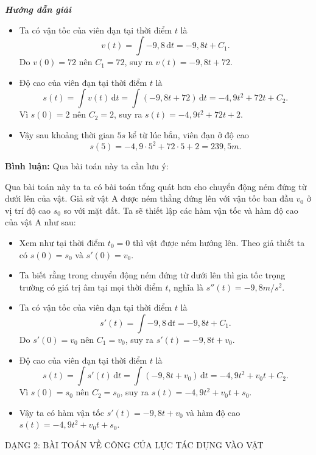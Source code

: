 \documentclass[12pt,a4paper]{article}
\newcommand{\dd}{\,\mathrm{d}}
\newcommand{\solution}{\begin{center}\textbf{\textit{Hướng dẫn giải}}\end{center}\par}
\newcommand{\commenthead}{\textbf{Bình luận:} Qua bài toán này ta cần lưu ý:\par}
\begin{document}
\solution
\begin{itemize}
\item Ta có vận tốc của viên đạn tại thời điểm $t$ là
\[
v(t)=\int-9,8\dd t=-9,8t+C_1.
\]
Do $v(0)=72$ nên $C_1=72$, suy ra $v(t)=-9,8t+72$.
\item Độ cao của viên đạn tại thời điểm $t$ là
\[
s(t)=\int v(t)\dd t=\int(-9,8t+72)\dd t=-4,9t^2+72t+C_2.
\]
Vì $s(0)=2$ nên $C_2=2$, suy ra $s(t)=-4,9t^2+72t+2$.
\item Vậy sau khoảng thời gian $5s$ kể từ lúc bắn, viên đạn ở độ cao
\[
s(5)=-4,9\cdot5^2+72\cdot5+2=239,5m.
\]
\end{itemize}

\begin{commentbox}\commenthead
Qua bài toán này ta ta có bài toán tổng quát hơn cho chuyển động ném đứng từ dưới lên của vật. Giả sử vật A được ném thẳng đứng lên với vận tốc ban đầu $v_0$ ở vị trí độ cao $s_0$ so với mặt đất. Ta sẽ thiết lập các hàm vận tốc và hàm độ cao của vật A như sau:
\end{commentbox}

\begin{itemize}
\item Xem như tại thời điểm $t_0=0$ thì vật được ném hướng lên. Theo giả thiết ta có $s(0)=s_0$
và $s'(0)=v_0$.
\item Ta biết rằng trong chuyển động ném đứng từ dưới lên thì gia tốc trọng trường có giá trị âm tại mọi thời điểm $t$, nghĩa là $s''(t)=-9,8m/s^2$.
\item Ta có vận tốc của viên đạn tại thời điểm $t$ là
\[
s'(t)=\int-9,8\dd t=-9,8t+C_1.
\]
Do $s'(0)=v_0$ nên $C_1=v_0$, suy ra $s'(t)=-9,8t+v_0$.
\item Độ cao của viên đạn tại thời điểm $t$ là
\[
s(t)=\int s'(t)\dd t=\int(-9,8t+v_0)\dd t=-4,9t^2+v_0t+C_2.
\]
Vì $s(0)=s_0$ nên $C_2=s_0$, suy ra $s(t)=-4,9t^2+v_0t+s_0$.
\item Vậy ta có hàm vận tốc $s'(t)=-9,8t+v_0$ và hàm độ cao $s(t)=-4,9t^2+v_0t+s_0$.
\end{itemize}


\begin{dangbox}DẠNG 2: BÀI TOÁN VỀ CÔNG CỦA LỰC TÁC DỤNG VÀO VẬT\end{dangbox}
\end{document}
